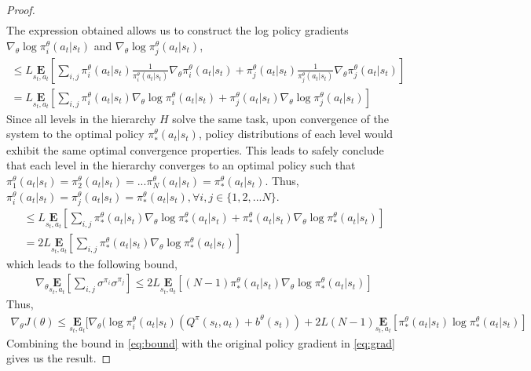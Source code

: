 \documentclass{article}
\begin{document}
\begin{proof}
\begin{gather}
    \end{gather}
    The expression obtained allows us to construct the log policy gradients $\nabla_{\theta}\log\pi^{\theta}_{i}(a_{t}|s_{t})$ and $\nabla_{\theta}\log\pi^{\theta}_{j}(a_{t}|s_{t})$,
    \begin{gather}
        \leq L\underset{s_{t},a_{t}}{\textbf{E}}[\sum_{i,j} \pi^{\theta}_{i}(a_{t}|s_{t})\frac{1}{\pi^{\theta}_{i}(a_{t}|s_{t})}\nabla_{\theta}\pi^{\theta}_{i}(a_{t}|s_{t}) + \pi^{\theta}_{j}(a_{t}|s_{t})\frac{1}{\pi^{\theta}_{j}(a_{t}|s_{t})}\nabla_{\theta}\pi^{\theta}_{j}(a_{t}|s_{t})] \nonumber \\       
        = L\underset{s_{t},a_{t}}{\textbf{E}}[\sum_{i,j} \pi^{\theta}_{i}(a_{t}|s_{t})\nabla_{\theta}\log\pi^{\theta}_{i}(a_{t}|s_{t}) + \pi^{\theta}_{j}(a_{t}|s_{t})\nabla_{\theta}\log\pi^{\theta}_{j}(a_{t}|s_{t})] \nonumber        
    \end{gather}
    Since all levels in the hierarchy $H$ solve the same task, upon convergence of the system to the optimal policy $\pi^{\theta}_{*}(a_{t}|s_{t})$, policy distributions of each level would exhibit the same optimal convergence properties. This leads to safely conclude that each level in the hierarchy converges to an optimal policy such that $\pi^{\theta}_{1}(a_{t}|s_{t}) = \pi^{\theta}_{2}(a_{t}|s_{t}) = ...\pi^{\theta}_{N}(a_{t}|s_{t}) = \pi^{\theta}_{*}(a_{t}|s_{t})$. Thus, $\pi^{\theta}_{i}(a_{t}|s_{t}) = \pi^{\theta}_{j}(a_{t}|s_{t}) = \pi^{\theta}_{*}(a_{t}|s_{t}), \forall i,j \in \{1,2,...N\}$.
    \begin{gather}
        \leq L\underset{s_{t},a_{t}}{\textbf{E}}[\sum_{i,j} \pi^{\theta}_{*}(a_{t}|s_{t})\nabla_{\theta}\log\pi^{\theta}_{*}(a_{t}|s_{t}) + \pi^{\theta}_{*}(a_{t}|s_{t})\nabla_{\theta}\log\pi^{\theta}_{*}(a_{t}|s_{t})] \nonumber \\
        = 2L\underset{s_{t},a_{t}}{\textbf{E}}[\sum_{i,j} \pi^{\theta}_{*}(a_{t}|s_{t})\nabla_{\theta}\log\pi^{\theta}_{*}(a_{t}|s_{t})] \nonumber               
    \end{gather}
    which leads to the following bound,
    \begin{gather}
        \nabla_{\theta}\underset{s_{t},a_{t}}{\textbf{E}}[\sum_{i,j} \sigma^{\pi_{i}}\sigma^{\pi_{j}}] \leq 2L\underset{s_{t},a_{t}}{\textbf{E}}[(N-1) \pi^{\theta}_{*}(a_{t}|s_{t})\nabla_{\theta}\log\pi^{\theta}_{*}(a_{t}|s_{t})] \label{eq:bound}               
    \end{gather}
    Thus,
    \begin{gather}
        \nabla_{\theta}J(\theta) \leq \underset{s_{t},a_{t}}{\textbf{E}}[\nabla_{\theta}(\log \pi^{\theta}_{i}(a_{t}|s_{t})(Q^{\pi}(s_{t},a_{t}) + b^{\theta}(s_{t})) + 2L(N-1)\underset{s_{t},a_{t}}{\textbf{E}}[\pi^{\theta}_{*}(a_{t}|s_{t})\log \pi^{\theta}_{*}(a_{t}|s_{t})] \nonumber
    \end{gather}
    Combining the bound in \autoref{eq:bound} with the original policy gradient in \autoref{eq:grad} gives us the result.
\end{proof}
\end{document}
